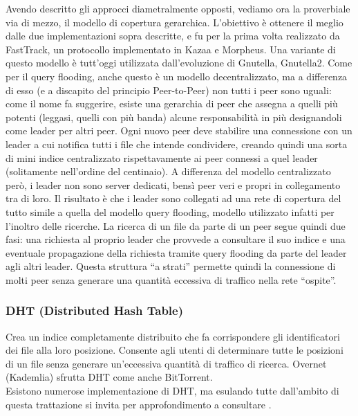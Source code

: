 Avendo descritto gli approcci diametralmente opposti, vediamo ora la proverbiale via di mezzo, il modello di copertura gerarchica. L'obiettivo è ottenere il meglio dalle due implementazioni sopra descritte, e fu per la prima volta realizzato da FastTrack, un protocollo implementato in Kazaa e Morpheus. Una variante di questo modello è tutt'oggi utilizzata dall'evoluzione di Gnutella, Gnutella2. Come per il query flooding, anche questo è un modello decentralizzato, ma a differenza di esso (e a discapito del principio Peer-to-Peer) non tutti i peer sono uguali: come il nome fa suggerire, esiste una gerarchia di peer che assegna a quelli più potenti (leggasi, quelli con più banda) alcune responsabilità in più designandoli come leader per altri peer. Ogni nuovo peer deve stabilire una connessione con un leader a cui notifica tutti i file che intende condividere, creando quindi una sorta di mini indice centralizzato rispettavamente ai peer connessi a quel leader (solitamente nell'ordine del centinaio). A differenza del modello centralizzato però, i leader non sono server dedicati, bensì peer veri e propri in collegamento tra di loro. Il risultato è che i leader sono collegati ad una rete di copertura del tutto simile a quella del modello query flooding, modello utilizzato infatti per l'inoltro delle ricerche. La ricerca di un file da parte di un peer segue quindi due fasi: una richiesta al proprio leader che provvede a consultare il suo indice e una eventuale propagazione della richiesta tramite query flooding da parte del leader agli altri leader. Questa struttura ``a strati'' permette quindi la connessione di molti peer senza generare una quantità eccessiva di traffico nella rete ``ospite''.

\subsubsection{DHT (Distributed Hash Table)}\label{dht-distributed-hash-table}

Crea un indice completamente distribuito che fa corrispondere gli identificatori dei file alla loro posizione. Consente agli utenti di determinare tutte le posizioni di un file senza generare un'eccessiva quantità di traffico di ricerca. Overnet (Kademlia) sfrutta DHT come anche BitTorrent.\\
Esistono numerose implementazione di DHT, ma esulando tutte dall'ambito di questa trattazione si invita per approfondimento a consultare \cite{distributed-computing}.
